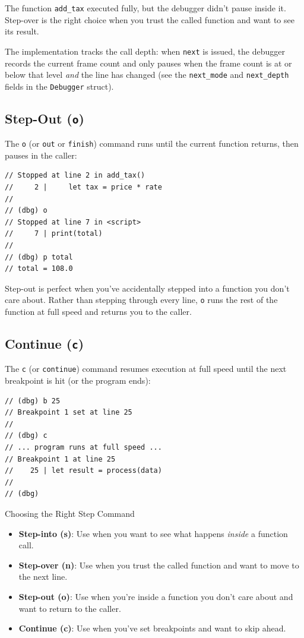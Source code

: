 The function \lstinline|add_tax| executed fully, but the debugger didn't pause inside it.
Step-over is the right choice when you trust the called function and want to see its result.

The implementation tracks the call depth: when \lstinline|next| is issued, the debugger records the current frame count and only pauses when the frame count is at or below that level \emph{and} the line has changed (see the \lstinline|next_mode| and \lstinline|next_depth| fields in the \lstinline|Debugger| struct).

\subsection{Step-Out (\texttt{o})}\label{sec:step-out}

The \lstinline|o| (or \lstinline|out| or \lstinline|finish|) command runs until the current function returns, then pauses in the caller:

\begin{lstlisting}[language=Lattice, caption={Stepping out of a function}]
// Stopped at line 2 in add_tax()
//     2 |     let tax = price * rate
//
// (dbg) o
// Stopped at line 7 in <script>
//     7 | print(total)
//
// (dbg) p total
// total = 108.0
\end{lstlisting}

Step-out is perfect when you've accidentally stepped into a function you don't care about.
Rather than stepping through every line, \lstinline|o| runs the rest of the function at full speed and returns you to the caller.

\subsection{Continue (\texttt{c})}\label{sec:continue}

The \lstinline|c| (or \lstinline|continue|) command resumes execution at full speed until the next breakpoint is hit (or the program ends):

\begin{lstlisting}[language=Lattice, caption={Continuing execution}]
// (dbg) b 25
// Breakpoint 1 set at line 25
//
// (dbg) c
// ... program runs at full speed ...
// Breakpoint 1 at line 25
//    25 | let result = process(data)
//
// (dbg)
\end{lstlisting}

\begin{notebox}{Choosing the Right Step Command}
\begin{itemize}
  \item \textbf{Step-into (s)}: Use when you want to see what happens \emph{inside} a function call.
  \item \textbf{Step-over (n)}: Use when you trust the called function and want to move to the next line.
  \item \textbf{Step-out (o)}: Use when you're inside a function you don't care about and want to return to the caller.
  \item \textbf{Continue (c)}: Use when you've set breakpoints and want to skip ahead.
\end{itemize}
\end{notebox}

